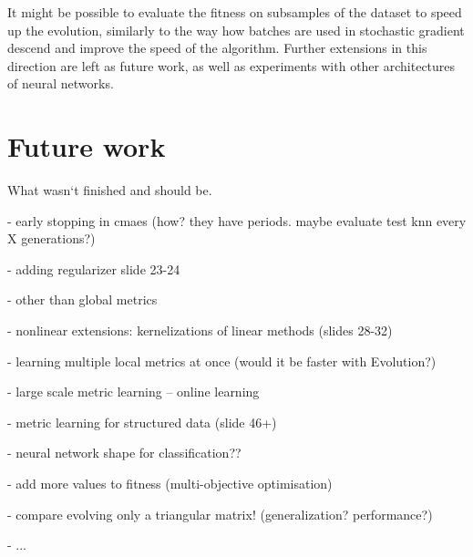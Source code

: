\documentclass[12pt,a4paper]{report}
\begin{document}
It might be possible to evaluate the fitness on subsamples of the dataset to speed up the evolution, similarly to the way how batches are used in stochastic gradient descend and improve the speed of the algorithm. Further extensions in this direction are left as future work, as well as experiments with other architectures of neural networks.

\chapter*{Future work}


What wasn`t finished and should be.

- early stopping in cmaes (how? they have periods. maybe evaluate test knn every X generations?)

- adding regularizer slide 23-24

- other than global metrics

- nonlinear extensions: kernelizations of linear methods (slides 28-32)

- learning multiple local metrics at once (would it be faster with Evolution?)

- large scale metric learning -- online learning

- metric learning for structured data (slide 46+)

- neural network shape for classification??

- add more values to fitness (multi-objective optimisation)

- compare evolving only a triangular matrix! (generalization? performance?)

- ...




\listoffigures

\listoftables

\end{document}
